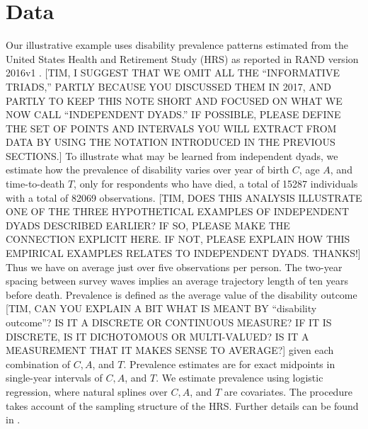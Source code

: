 \documentclass{bmcart}
\begin{document}
\section*{Data}
Our illustrative example uses disability prevalence patterns estimated from the United States Health and Retirement Study 
(HRS) as reported in RAND version 2016v1 \citep{HRS, RAND}.
[TIM, I SUGGEST THAT WE OMIT ALL THE ``INFORMATIVE TRIADS,''
PARTLY BECAUSE YOU DISCUSSED THEM IN 2017, 
AND PARTLY TO KEEP THIS NOTE SHORT AND FOCUSED ON WHAT WE NOW CALL ``INDEPENDENT DYADS.''
IF POSSIBLE, PLEASE DEFINE THE SET OF POINTS AND INTERVALS YOU WILL EXTRACT 
FROM DATA BY USING THE NOTATION INTRODUCED IN THE PREVIOUS SECTIONS.]
To illustrate what may be learned from independent dyads,
we estimate how the prevalence of disability varies over year of birth $C$, age $A$, and time-to-death $T$,  
only for respondents who have died, a total of 15287 individuals with a total of 82069 observations.
[TIM, DOES THIS ANALYSIS ILLUSTRATE ONE OF THE THREE HYPOTHETICAL EXAMPLES
OF INDEPENDENT DYADS DESCRIBED EARLIER? 
IF SO, PLEASE MAKE THE CONNECTION EXPLICIT HERE.
IF NOT, PLEASE EXPLAIN HOW THIS EMPIRICAL EXAMPLES RELATES TO INDEPENDENT DYADS.
THANKS!] 
Thus we have on average just over five observations per person.
The two-year spacing between survey waves implies an average trajectory length of ten years before death. 
Prevalence is defined as the average value of the disability outcome 
[TIM, CAN YOU EXPLAIN A BIT WHAT IS MEANT BY ``disability outcome''? 
IS IT A DISCRETE OR CONTINUOUS MEASURE? 
IF IT IS DISCRETE, IS IT DICHOTOMOUS OR MULTI-VALUED?
IS IT A MEASUREMENT THAT IT MAKES SENSE TO AVERAGE?]
given each combination of $C, A$, and $T$. 
Prevalence estimates are for exact midpoints in single-year intervals of $C, A$, and $T$. 
We estimate prevalence using logistic regression, where natural splines over $C, A$, and $T$ are covariates. 
The procedure takes account of the sampling structure of the HRS.
Further details can be found in \citet{riffe2017hle}. 

\end{document}
